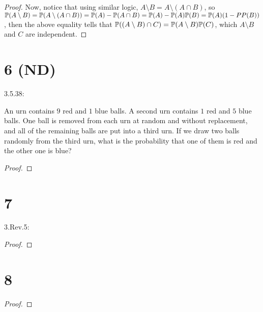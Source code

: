\documentclass{article}
\begin{document}
\begin{proof}
    Now, notice that using similar logic, $A\setminus B=A\setminus (A\cap B)$, so $\mathbb{P}(A\setminus B)=\mathbb{P}(A\setminus (A\cap B))=\mathbb{P}(A)-\mathbb{P}(A\cap B)=\mathbb{P}(A)-\mathbb{P}(A)\mathbb{P}(B)=\mathbb{P}(A)(1-PP(B))$, then the above equality tells that $\mathbb{P}((A\setminus B)\cap C)=\mathbb{P}(A\setminus B)\mathbb{P}(C)$, which $A\setminus B$ and $C$ are independent.
\end{proof}

\newpage
\section*{6 (ND)}
\begin{ques}\label{q6}
    3.5.38:

    An urn contains $9$ red and $1$ blue balls. A second urn contains $1$ red and $5$ blue balls. One ball is removed from each urn at random and without replacement, and all of the remaining balls are put into a third urn. If we draw two balls randomly from the third urn, what is the probability that one of them is red and the other one is blue?
\end{ques}

\begin{proof}

\end{proof}

\newpage
\section*{7}
\begin{ques}\label{q7}
    3.Rev.5:

    
\end{ques}

\begin{proof}
\end{proof}

\newpage
\section*{8}
\begin{ques}\label{q8}
\end{ques}

\begin{proof}
\end{proof}
\end{document}
